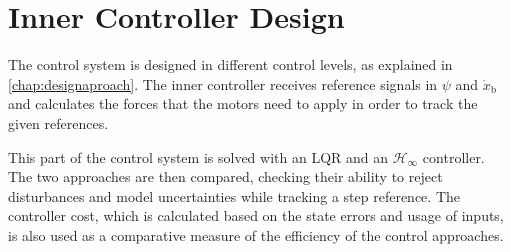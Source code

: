 \chapter{Inner Controller Design}\label{chap:innercontrol}
The control system is designed in different control levels, as explained in \autoref{chap:designaproach}. The inner controller receives reference signals in $\psi$ and $\dot{x}_\mathrm{b}$ and calculates the forces that the motors need to apply in order to track the given references. 

This part of the control system is solved with an LQR and an $\mathcal{H}_\infty$ controller. The two approaches are then compared, checking their ability to reject disturbances and model uncertainties while tracking a step reference. The controller cost, which is calculated based on the state errors and usage of inputs, is also used as a comparative measure of the efficiency of the control approaches.



